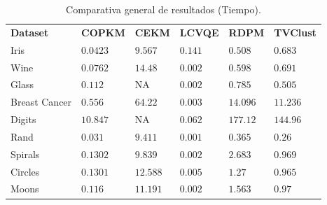 \begin{table}[!h]
	\centering
	\setlength{\arrayrulewidth}{1mm}
	\setlength{\tabcolsep}{9pt}
	\renewcommand{\arraystretch}{0.8}
	
	\begin{tabular}{ >{\centering\arraybackslash}m{2.5cm}  >{\centering\arraybackslash}m{1.2cm}>{\centering\arraybackslash}m{1.1cm}>{\centering\arraybackslash}m{1.1cm}>{\centering\arraybackslash}m{1.1cm}>{\centering\arraybackslash}m{1.3cm}}
		\hline
		\rowcolor{black}
		\multicolumn{6}{c}{\bf \color{white}{Comparativa General de Resultados (Tiempo)}}\\
		\hline
		\rowcolor{gray!50}
		\textbf{Dataset} & \textbf{COPKM} & \textbf{CEKM} & \textbf{LCVQE} & \textbf{RDPM} & \textbf{TVClust}  \\
		Iris & $\boldsymbol{0.0423}$  & $9.567 $ & $0.141 $ & $0.508 $ & $0.683 $ \\
		Wine & $0.0762 $  & $14.48 $ & $\boldsymbol{0.002}$ & $0.598 $ & $0.691 $ \\
		Glass & $0.112 $  & NA & $\boldsymbol{0.002}$ & $0.785 $ & $0.505 $ \\
		Breast Cancer & $0.556 $ & $64.22 $ & $\boldsymbol{0.003}$ & $14.096 $ & $11.236 $\\
		Digits & $10.847 $ & NA & $\boldsymbol{0.062}$ & $177.12 $ & $144.96 $ \\
		Rand & $0.031 $ & $9.411 $ & $\boldsymbol{0.001}$ & $0.365 $ & $0.26 $ \\
		Spirals & $0.1302 $ & $9.839 $ & $\boldsymbol{0.002}$ & $2.683 $ & $0.969 $ \\
		Circles & $0.1301 $ & $12.588 $ & $\boldsymbol{0.005}$ & $1.27 $ & $0.965 $ \\
		Moons & $0.116 $ & $11.191 $ & $\boldsymbol{0.002}$ & $1.563 $ & $0.97 $ \\
		\hline
		
	\end{tabular}
	\caption{Comparativa general de resultados (Tiempo).}
	\label{tab:tabla14}
\end{table}

